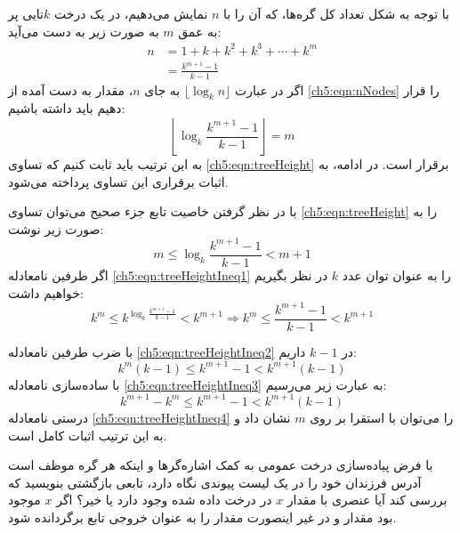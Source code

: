 با توجه به شکل تعداد کل گره‌ها، که آن را با {$n$} نمایش می‌دهیم، در یک درخت {$k$}تایی پر به عمق {$m$} به صورت زیر به دست می‌آید:
\begin{align}
n &= 1+k+k^2+k^3+\cdots + k^m\nonumber\\
   &=\frac{k^{m+1}-1}{k-1}\label{ch5:eqn:nNodes}
\end{align}
اگر در عبارت {$\lfloor \log_k n \rfloor$} به جای {$n$}، مقدار به دست آمده از {\ref{ch5:eqn:nNodes}} را قرار دهیم باید داشته باشیم:
\begin{equation}
\left\lfloor \log_k \frac{k^{m+1}-1}{k-1} \right\rfloor=m\label{ch5:eqn:treeHeight}
\end{equation}
به این ترتیب باید ثابت کنیم که تساوی {\ref{ch5:eqn:treeHeight}} برقرار است. در ادامه، به اثبات برقراری این تساوی پرداخته می‌شود.

با در نظر گرفتن خاصیت تابع جزء صحیح می‌توان تساوی {\ref{ch5:eqn:treeHeight}} را به صورت زیر نوشت:
\begin{equation}
m \leq \log_k \frac{k^{m+1}-1}{k-1} < m+1\label{ch5:eqn:treeHeightIneq1}
\end{equation}
اگر طرفین نامعادله {\ref{ch5:eqn:treeHeightIneq1}} را به عنوان توان عدد {$k$} در نظر بگیریم خواهیم داشت:
\begin{equation}
k^m \leq k^{\log_k \frac{k^{m+1}-1}{k-1}} < k^{m+1} \Rightarrow k^m \leq \frac{k^{m+1}-1}{k-1} < k^{m+1}\label{ch5:eqn:treeHeightIneq2}
\end{equation}

با ضرب طرفین نامعادله {\ref{ch5:eqn:treeHeightIneq2}} در {$k-1$} داریم:
\begin{equation}
k^m(k-1) \leq k^{m+1}-1 < k^{m+1}(k-1)\label{ch5:eqn:treeHeightIneq3}
\end{equation}
با ساده‌سازی نامعادله {\ref{ch5:eqn:treeHeightIneq3}} به عبارت زیر می‌رسیم:
\begin{equation}
k^{m+1}-k^m \leq k^{m+1}-1 < k^{m+1}(k-1)\label{ch5:eqn:treeHeightIneq4}
\end{equation}
درستی نامعادله {\ref{ch5:eqn:treeHeightIneq4}} را می‌توان با استقرا بر روی {$m$} نشان داد و به این ترتیب اثبات کامل است.

 با فرض پیاده‌سازی درخت عمومی به کمک اشاره‌گرها و اینکه هر گره موظف است آدرس فرزندان خود را در یک لیست پیوندی نگاه دارد، تابعی بازگشتی بنویسید که بررسی کند آیا عنصری با مقدار {$x$} در درخت داده شده وجود دارد یا خیر؟ اگر {$x$} موجود بود مقدار {} و در غیر اینصورت مقدار {} را به عنوان خروجی تابع برگردانده شود.



